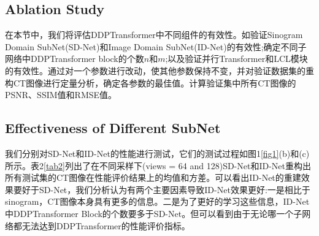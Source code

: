 \subsection{Ablation Study}
在本节中，我们将评估DDPTransformer中不同组件的有效性。如验证Sinogram Domain SubNet(SD-Net)和Image Domain SubNet(ID-Net)的有效性;确定不同子网络中DDPTransformer block的个数$n$和$m$;以及验证并行Transformer和LCL模块的有效性。通过对一个参数进行改动，使其他参数保持不变，并对验证数据集的重构CT图像进行定量分析，确定各参数的最佳值。计算验证集中所有CT图像的PSNR、SSIM值和RMSE值。\par
\subsection{Effectiveness of Different SubNet}
我们分别对SD-Net和ID-Net的性能进行测试，它们的测试过程如图1\ref{fig1}(b)和(c)所示。表2\ref{tab2}列出了在不同采样下(views = 64 and 128)SD-Net和ID-Net重构出所有测试集的CT图像在性能评价结果上的均值和方差。可以看出ID-Net的重建效果要好于SD-Net，我们分析认为有两个主要因素导致ID-Net效果更好:一是相比于sinogram，CT图像本身具有更多的信息。二是为了更好的学习这些信息，ID-Net中DDPTransformer Block的个数要多于SD-Net。但可以看到由于无论哪一个子网络都无法达到DDPTransformer的性能评价指标。\par
\begin{table}[H]
	\centering
	\caption{子网络的性能评价结果(均值$\pm$方差)}
	\label{tab2}
\end{table}

